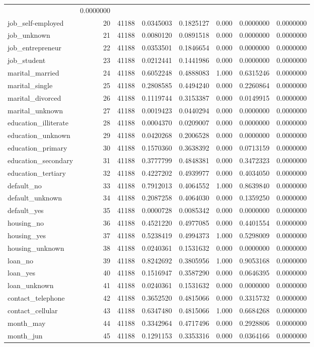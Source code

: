 \documentclass[english,man]{apa6}
\begin{document}
\begin{longtable}[c]{@{}lrrrrrrr@{}}
& 0.0000000\tabularnewline
job\_self-employed & 20 & 41188 & 0.0345003 & 0.1825127 & 0.000 &
0.0000000 & 0.0000000\tabularnewline
job\_unknown & 21 & 41188 & 0.0080120 & 0.0891518 & 0.000 & 0.0000000 &
0.0000000\tabularnewline
job\_entrepreneur & 22 & 41188 & 0.0353501 & 0.1846654 & 0.000 &
0.0000000 & 0.0000000\tabularnewline
job\_student & 23 & 41188 & 0.0212441 & 0.1441986 & 0.000 & 0.0000000 &
0.0000000\tabularnewline
marital\_married & 24 & 41188 & 0.6052248 & 0.4888083 & 1.000 &
0.6315246 & 0.0000000\tabularnewline
marital\_single & 25 & 41188 & 0.2808585 & 0.4494240 & 0.000 & 0.2260864
& 0.0000000\tabularnewline
marital\_divorced & 26 & 41188 & 0.1119744 & 0.3153387 & 0.000 &
0.0149915 & 0.0000000\tabularnewline
marital\_unknown & 27 & 41188 & 0.0019423 & 0.0440294 & 0.000 &
0.0000000 & 0.0000000\tabularnewline
education\_illiterate & 28 & 41188 & 0.0004370 & 0.0209007 & 0.000 &
0.0000000 & 0.0000000\tabularnewline
education\_unknown & 29 & 41188 & 0.0420268 & 0.2006528 & 0.000 &
0.0000000 & 0.0000000\tabularnewline
education\_primary & 30 & 41188 & 0.1570360 & 0.3638392 & 0.000 &
0.0713159 & 0.0000000\tabularnewline
education\_secondary & 31 & 41188 & 0.3777799 & 0.4848381 & 0.000 &
0.3472323 & 0.0000000\tabularnewline
education\_tertiary & 32 & 41188 & 0.4227202 & 0.4939977 & 0.000 &
0.4034050 & 0.0000000\tabularnewline
default\_no & 33 & 41188 & 0.7912013 & 0.4064552 & 1.000 & 0.8639840 &
0.0000000\tabularnewline
default\_unknown & 34 & 41188 & 0.2087258 & 0.4064030 & 0.000 &
0.1359250 & 0.0000000\tabularnewline
default\_yes & 35 & 41188 & 0.0000728 & 0.0085342 & 0.000 & 0.0000000 &
0.0000000\tabularnewline
housing\_no & 36 & 41188 & 0.4521220 & 0.4977085 & 0.000 & 0.4401554 &
0.0000000\tabularnewline
housing\_yes & 37 & 41188 & 0.5238419 & 0.4994373 & 1.000 & 0.5298009 &
0.0000000\tabularnewline
housing\_unknown & 38 & 41188 & 0.0240361 & 0.1531632 & 0.000 &
0.0000000 & 0.0000000\tabularnewline
loan\_no & 39 & 41188 & 0.8242692 & 0.3805956 & 1.000 & 0.9053168 &
0.0000000\tabularnewline
loan\_yes & 40 & 41188 & 0.1516947 & 0.3587290 & 0.000 & 0.0646395 &
0.0000000\tabularnewline
loan\_unknown & 41 & 41188 & 0.0240361 & 0.1531632 & 0.000 & 0.0000000 &
0.0000000\tabularnewline
contact\_telephone & 42 & 41188 & 0.3652520 & 0.4815066 & 0.000 &
0.3315732 & 0.0000000\tabularnewline
contact\_cellular & 43 & 41188 & 0.6347480 & 0.4815066 & 1.000 &
0.6684268 & 0.0000000\tabularnewline
month\_may & 44 & 41188 & 0.3342964 & 0.4717496 & 0.000 & 0.2928806 &
0.0000000\tabularnewline
month\_jun & 45 & 41188 & 0.1291153 & 0.3353316 & 0.000 & 0.0364166 &
0.0000000\tabularnewline

\end{longtable}
\end{document}
